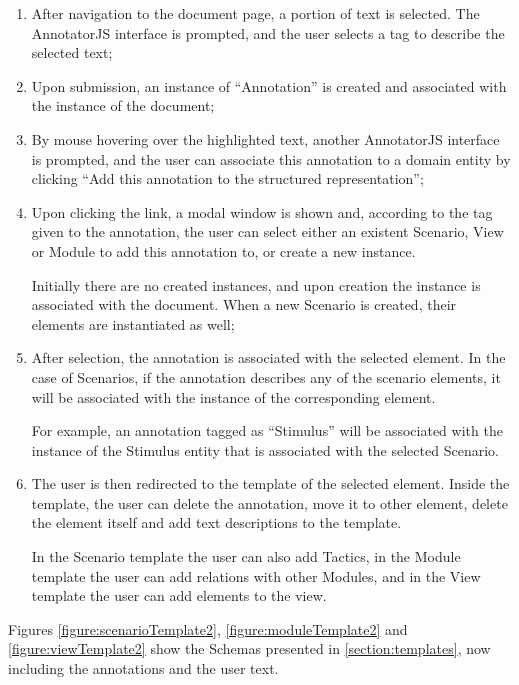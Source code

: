 \begin{enumerate}
\item After navigation to the document page, a portion of text is selected. The AnnotatorJS interface is prompted, and the user selects a tag to describe the selected text;

\item Upon submission, an instance of ``Annotation'' is created and associated with the instance of the document;

\item By mouse hovering over the highlighted text, another AnnotatorJS interface is prompted, and the user can associate this annotation to a domain entity by clicking ``Add this annotation to the structured representation'';

\item Upon clicking the link, a modal window is shown and, according to the tag given to the annotation, the user can select either an existent Scenario, View or Module to add this annotation to, or create a new instance. 

Initially there are no created instances, and upon creation the instance is associated with the document. When a new Scenario is created, their elements are instantiated as well;

\item After selection, the annotation is associated with the selected element. In the case of Scenarios, if the annotation describes any of the scenario elements, it will be associated with the instance of the corresponding element. 

For example, an annotation tagged as ``Stimulus'' will be associated with the instance of the Stimulus entity that is associated with the selected Scenario.

\item The user is then redirected to the template of the selected element. Inside the template, the user can delete the annotation, move it to other element, delete the element itself and add text descriptions to the template. 

In the Scenario template the user can also add Tactics, in the Module template the user can add relations with other Modules, and in the View template the user can add elements to the view.
\end{enumerate}

Figures \ref{figure:scenarioTemplate2}, \ref{figure:moduleTemplate2} and \ref{figure:viewTemplate2} show the Schemas presented in \ref{section:templates}, now including the annotations and the user text.


